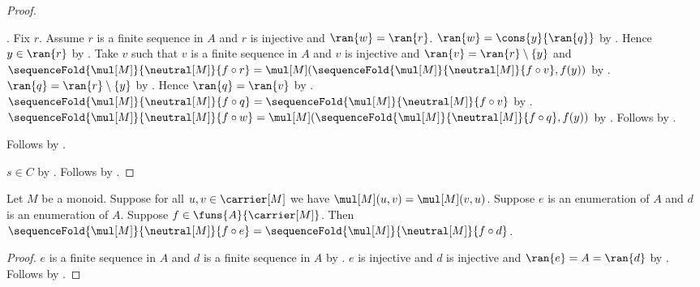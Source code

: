 \begin{proof}
\begin{subproof}
\begin{subproof}
                .
            Fix $r$.
            Assume $r$ is a finite sequence in $A$ and
                $r$ is injective and $\ran{w}=\ran{r}$.
            $\ran{w}=\cons{y}{\ran{q}}$ by
                .
            Hence $y\in\ran{r}$ by .
            Take $v$ such that
                $v$ is a finite sequence in $A$ and
                $v$ is injective and
                $\ran{v}=\ran{r}\setminus\{y\}$ and
                $\sequenceFold{\mul[M]}{\neutral[M]}{f\circ r}
                    =\mul[M]
                        (\sequenceFold{\mul[M]}{\neutral[M]}{f\circ v},
                         f(y))$ by
                .
            $\ran{q}=\ran{r}\setminus\{y\}$ by
                .
            Hence $\ran{q}=\ran{v}$ by \auto.
            $\sequenceFold{\mul[M]}{\neutral[M]}{f\circ q}
                =\sequenceFold{\mul[M]}{\neutral[M]}{f\circ v}$ by
                \auto.
            $\sequenceFold{\mul[M]}{\neutral[M]}{f\circ w}
                =\mul[M]
                    (\sequenceFold{\mul[M]}{\neutral[M]}{f\circ q},
                     f(y))$ by
                .
            Follows by \auto.
        \end{subproof}
        Follows by \auto.
    \end{subproof}
    $s\in C$ by .
    Follows by \auto.
\end{proof}

\begin{corollary}\label{spike_enumeration_fold_invariant}
    Let $M$ be a monoid.
    Suppose for all $u,v\in\carrier[M]$ we have
        $\mul[M](u,v)=\mul[M](v,u)$.
    Suppose $e$ is an enumeration of $A$ and
        $d$ is an enumeration of $A$.
    Suppose $f\in\funs{A}{\carrier[M]}$.
    Then
        $\sequenceFold{\mul[M]}{\neutral[M]}{f\circ e}
            =\sequenceFold{\mul[M]}{\neutral[M]}{f\circ d}$.
\end{corollary}
\begin{proof}
    $e$ is a finite sequence in $A$ and
        $d$ is a finite sequence in $A$ by
        .
    $e$ is injective and $d$ is injective and
        $\ran{e}=A=\ran{d}$ by
        .
    Follows by .
\end{proof}

